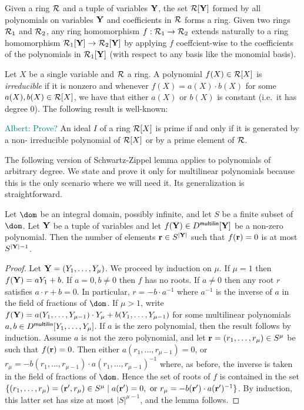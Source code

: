\documentclass[11pt,letterpaper,usenames,dvipsnames]{article}
\newcommand{\albert}[1]{\textcolor{teal}{Albert: {#1}}}
\begin{document}
Given a ring $\mathcal{R}$ and a tuple of variables $\mathbf{Y}$, the set $\mathcal{R}[\mathbf{Y}]$ formed by all polynomials on variables $\mathbf{Y}$ and coefficients in $\mathcal{R}$ forms a ring. Given two rings $\mathcal{R}_1$ and $\mathcal{R}_2$, any ring homomorphism $f:\mathcal{R}_1 \to \mathcal{R}_2$  extends naturally to a ring homomorphism $\mathcal{R}_1[\mathbf{Y}] \to \mathcal{R}_2[\mathbf{Y}]$ by applying $f$ coeffcient-wise to the coefficients of the polynomials in $\mathcal{R}_1[\mathbf{Y}]$ (with respect to any basis like the monomial basis). 

Let $X$ be a single variable and $\mathcal{R}$ a ring. A polynomial $f(X)\in \mathcal{R}[X]$ is \emph{irreducible} if it is nonzero and whenever $f(X)=a(X)\cdot b(X)$ for some $a(X), b(X)\in \mathcal{R}[X]$, we have that either $a(X)$ or $b(X)$ is constant (i.e.\ it has degree $0$). The following result is well-known:
\begin{remark}\label{r: prime_ideals_of_RX}
\albert{Prove?} An ideal $I$ of a ring $\mathcal{R}[X]$ is prime if and only if it is generated by a non- irreducible polynomial of $\mathcal{R}[X]$ or by a prime element of $\mathcal{R}$.
\end{remark}

The following version of Schwartz-Zippel lemma applies to polynomials of arbitrary degree. We state and prove it only for multilinear polynomials because this is the only scenario where we will need it. Its generalization is straightforward.
\begin{lemma}\label{l: SZ_for_integral_domains}
%
Let $\dom$ be an integral domain, possibly infinite, and let $S$ be a finite subset of $\dom$. Let $\mathbf{Y}$ be a tuple of variables and let $f(\mathbf{Y})\in D^{\mathsf{multilin}}[\mathbf{Y}]$ be a non-zero polynomial. Then the number of elements $\mathbf{r}\in S^{|\mathbf{Y}|}$ such that $f(\mathbf{r})=0$ is at most $S^{|\mathbf{Y}|-1}$. 
%
\end{lemma}
\begin{proof}
Let $\mathbf{Y}=(Y_1,\ldots, Y_\mu)$. We proceed by induction on $\mu$. If $\mu=1$ then $f(\mathbf{Y}) = a Y_1 + b$. If $a=0, b\neq 0$ then $f$ has no roots. If $a\neq 0$ then any root $r$ satisfies $a\cdot r + b = 0$. In particular, $r = -b\cdot a^{-1}$ where $a^{-1}$ is the inverse of $a$ in the field of fractions of $\dom$. If $\mu > 1$, write  $f(\mathbf{Y}) = a(Y_1,\ldots, Y_{\mu-1}) \cdot Y_\mu +  b(Y_1,\ldots, Y_{\mu-1})$ for some multilinear polynomials $a,b\in D^{\mathsf{multilin}}[Y_1,\ldots, Y_\mu]$. If $a$ is the zero polynomial, then the result follows by induction. Assume $a$ is not the zero polynomial, and let  $\mathbf{r}=(r_1,\ldots, r_{\mu}) \in  S^{\mu}$ be such that $f(\mathbf{r})=0$. Then either $a(r_1,\ldots, r_{\mu-1})=0$, or $r_\mu = -b(r_1,\ldots, r_{\mu-1})\cdot a(r_1,\ldots, r_{\mu-1})^{-1}$ where, as before, the inverse is taken in the field of fractions of $\dom$.  Hence the set of roots of $f$  is contained in the set $\{(r_1,\ldots,r_\mu)=(\mathbf{r}',r_\mu) \in S^\mu \mid a(\mathbf{r}')= 0, \text{ or } r_\mu = -b(\mathbf{r}')\cdot a(\mathbf{r}')^{-1}\}$. By induction, this latter set has size at most $|S|^{\mu-1}$, and the lemma follows. 
%
\end{proof}
\end{document}
